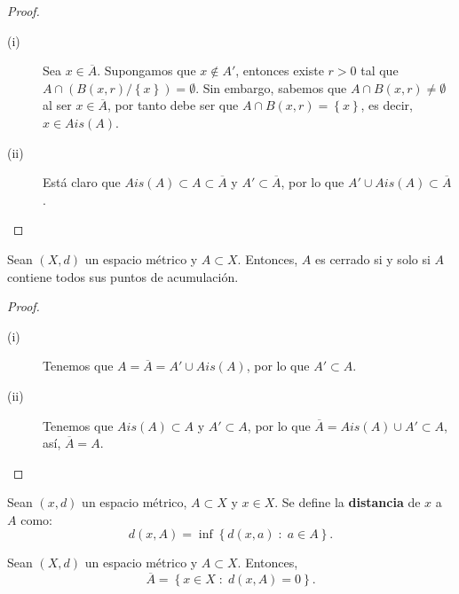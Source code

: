 \begin{proof}
\begin{description}
	\item[(i)] Sea $\displaystyle x \in \overline{A} $. Supongamos que $\displaystyle x \not\in A' $, entonces existe $\displaystyle r > 0 $ tal que $\displaystyle A \cap \left(B\left(x,r\right)/ \left\{ x\right\} \right) = \emptyset $. Sin embargo, sabemos que $\displaystyle A \cap B\left(x,r\right) \neq \emptyset $ al ser $\displaystyle x \in \overline{A} $, por tanto debe ser que $\displaystyle A \cap B\left(x,r\right) = \left\{ x\right\}  $, es decir, $\displaystyle x \in Ais\left(A\right) $.
\item[(ii)] Está claro que $\displaystyle Ais\left(A\right) \subset A \subset \overline{A} $ y $\displaystyle A' \subset \overline{A} $, por lo que $\displaystyle A' \cup Ais\left(A\right) \subset \overline{A} $.
\end{description}
\end{proof}
\begin{colorary}
Sean $\displaystyle \left(X,d\right) $ un espacio métrico y $\displaystyle A \subset X $. Entonces, $\displaystyle A $ es cerrado si y solo si $\displaystyle A $ contiene todos sus puntos de acumulación.
\end{colorary}
\begin{proof}
\begin{description}
\item[(i)] Tenemos que $\displaystyle A = \overline{A} = A' \cup Ais\left(A\right)  $, por lo que $\displaystyle A' \subset A $.
\item[(ii)] Tenemos que $\displaystyle Ais\left(A\right) \subset A $ y $\displaystyle A' \subset A $, por lo que $\displaystyle \overline{A} = Ais\left(A\right) \cup A' \subset A $, así, $\displaystyle \overline{A} = A $.
\end{description}
\end{proof}
\begin{definition}
	Sean $\displaystyle \left(x,d\right) $ un espacio métrico, $\displaystyle A \subset X $ y $\displaystyle x \in X $. Se define la \textbf{distancia} de $\displaystyle x $ a $\displaystyle A $ como:
\[d\left(x,A\right) = \inf \left\{ d\left(x,a\right) \; : \; a \in A\right\}  .\]
\end{definition}
\begin{prop}
	Sean $\displaystyle \left(X,d\right) $ un espacio métrico y $\displaystyle A \subset X $. Entonces, 
	\[ \overline{A} = \left\{ x \in X \; : \; d\left(x,A\right) = 0\right\}.\]
\end{prop}

